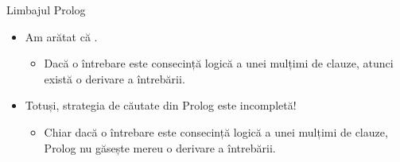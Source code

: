 \documentclass[xcolor=pdftex,romanian,colorlinks]{beamer}
\begin{document}
%
%
%
%
%

\begin{frame}{Limbajul Prolog}
\begin{itemize}
	\item Am arătat că . 
	\begin{itemize}
		\item Dacă o întrebare este consecință logică a unei mulțimi de clauze, atunci există o derivare a întrebării.
	\end{itemize}
	\medskip
	\item Totuși, \alert{strategia de căutate din Prolog este incompletă!}
	\begin{itemize}
		\item Chiar dacă o întrebare este consecință logică a unei mulțimi de clauze, Prolog nu găsește mereu o derivare a întrebării.
	\end{itemize}
	
\end{itemize}
\end{frame}
\end{document}
